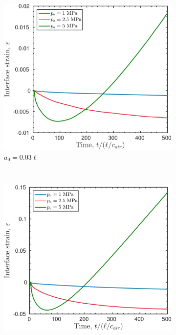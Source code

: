 \begin{figure}
  \centering
  \begin{subfigure}[b]{0.49\textwidth}
    \includegraphics[width=\textwidth]{./figs/lung_figs/rmawave_1_A10,25,50_a03_strain_08-Mar-2017}
    \caption{\label{fig:strain_multi-pa_a03} $a_0 = 0.03\ell$}
  \end{subfigure}
  ~ 
  \begin{subfigure}[b]{0.49\textwidth}
    \includegraphics[width=\textwidth]{./figs/lung_figs/rmawave_1_A10,25,50_a10_strain_08-Mar-2017}

\end{subfigure}
\end{figure}
